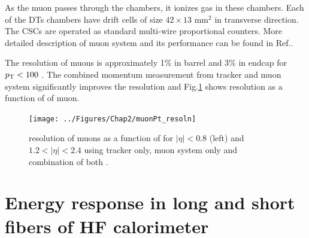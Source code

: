 As the muon passes through the chambers, it ionizes gas in these chambers. Each of the DTs chambers have drift cells of size $42\times 13$ 
mm$^2$ in transverse direction. The CSCs are operated as standard multi-wire proportional counters. More detailed description of muon 
system and its performance can be found in Ref.\cite{Sirunyan:2018fpa,Chatrchyan:2008aa,Chatrchyan:2013sba}.

The \pt resolution of muons is approximately 1\% in barrel and 3\% in endcap for $p_{\mathrm{T}} < 100$ \gev \cite{Sirunyan:2018fpa}. The combined 
momentum measurement from tracker and muon system significantly improves the resolution and Fig.\ref{fig:muonPt_resoln} shows \pt 
resolution as a function of \pt of muon.

\begin{figure}[h!]
\centering
\texttt{[image: ../Figures/Chap2/muonPt\_resoln]}
\captionsetup{width=.95\linewidth}
\caption[Muon \pt resolution]{\pt resolution of muons as a function of \pt for $|\eta| < 0.8$ (left) and $1.2 < |\eta| < 2.4$ using 
tracker only, muon system only and combination of both \cite{Chatrchyan:2008aa}.}
\label{fig:muonPt_resoln}
\end{figure}


\section{Energy response in long and short fibers of HF calorimeter}
\label{chap2HFsec}

\newpage
